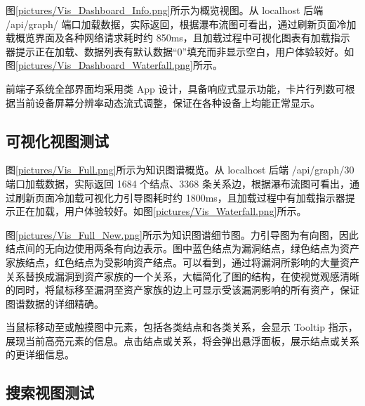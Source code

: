 \documentclass[a4paper,AutoFakeBold,oneside,12pt]{book}
\begin{document}
图\ref{pictures/Vis_Dashboard_Info.png}所示为概览视图。从 localhost 后端 /api/graph/ 端口加载数据，实际返回，根据瀑布流图可看出，通过刷新页面冷加载概览界面及各种网络请求耗时约 850ms，且加载过程中可视化图表有加载指示器提示正在加载、数据列表有默认数据``0''填充而非显示空白，用户体验较好。如图\ref{pictures/Vis_Dashboard_Waterfall.png}所示。

前端子系统全部界面均采用类 App 设计，具备响应式显示功能，卡片行列数可根据当前设备屏幕分辨率动态流式调整，保证在各种设备上均能正常显示。



\subsection{可视化视图测试\label{可视化视图测试}}

图\ref{pictures/Vis_Full.png}所示为知识图谱概览。从 localhost 后端 /api/graph/30 端口加载数据，实际返回 1684 个结点、3368 条关系边，根据瀑布流图可看出，通过刷新页面冷加载可视化力引导图耗时约 1800ms，且加载过程中有加载指示器提示正在加载，用户体验较好。如图\ref{pictures/Vis_Waterfall.png}所示。



图\ref{pictures/Vis_Full_New.png}所示为知识图谱细节图。力引导图为有向图，因此结点间的无向边使用两条有向边表示。图中蓝色结点为漏洞结点，绿色结点为资产家族结点，红色结点为受影响资产结点。可以看到，通过将漏洞所影响的大量资产关系替换成漏洞到资产家族的一个关系，大幅简化了图的结构，在使视觉观感清晰的同时，将鼠标移至漏洞至资产家族的边上可显示受该漏洞影响的所有资产，保证图谱数据的详细精确。

当鼠标移动至或触摸图中元素，包括各类结点和各类关系，会显示 Tooltip 指示，展现当前高亮元素的信息。点击结点或关系，将会弹出悬浮面板，展示结点或关系的更详细信息。


\subsection{搜索视图测试}
\end{document}
